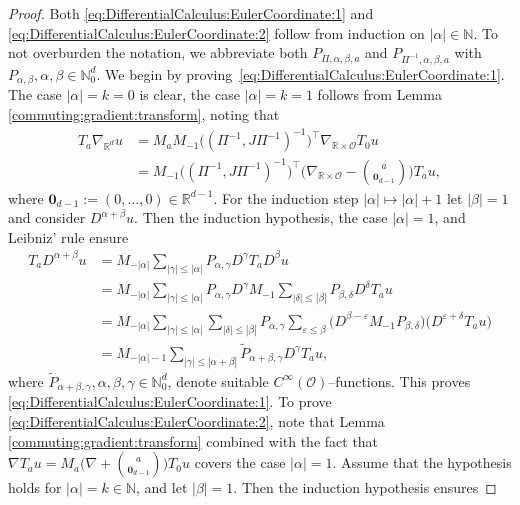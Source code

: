 \documentclass[12pt,a4paper, reqno]{amsart}
\theoremstyle{plain}
\theoremstyle{definition}
\theoremstyle{remark}
\numberwithin{equation}{section}
\newcommand{\1}{\mathbbm{1}}
\newcommand{\R}{\ensuremath{\mathbb{R}}}
\newcommand{\N}{\ensuremath{\mathbb{N}}}
\newcommand{\calO}{\ensuremath{\mathcal{O}}}
\begin{document}
\begin{proof}
    Both \eqref{eq:DifferentialCalculus:EulerCoordinate:1} and \eqref{eq:DifferentialCalculus:EulerCoordinate:2} follow from induction on $|\alpha|\in\N$. To not overburden the notation, we abbreviate both  $P_{\Pi,\alpha,\beta,a}$ and $P_{\Pi^{-1},\alpha,\beta,a}$ with  $P_{\alpha,\beta}, \alpha,\beta\in\N_0^d$.
    We begin by proving~\eqref{eq:DifferentialCalculus:EulerCoordinate:1}. 
    The case $|\alpha|=k=0$ is clear, the case $|\alpha|=k=1$ follows from Lemma \ref{commuting:gradient:transform},
    noting that 
    \[\begin{aligned}
        T_a\nabla_{\R^d} u &= M_a M_{-1}\Big( (\Pi^{-1}, J\Pi^{-1})^{-1}\Big)^\top \nabla_{\R\times\calO}T_0u\\ 
        &= M_{-1} \Big( (\Pi^{-1}, J\Pi^{-1})^{-1}\Big)^\top \bigg(\nabla_{\R\times\calO} -\binom{a}{\bm{0}_{d-1}}\bigg) T_au,
    \end{aligned}\]
    where $\bm{0}_{d-1}:=(0,\ldots,0)\in \R^{d-1}.$
    For the induction step $|\alpha|\mapsto |\alpha|+1$  let $|\beta|=1$ and consider $D^{\alpha+\beta}u$. Then the induction hypothesis, the case $|\alpha|=1$, and Leibniz' rule  ensure 
    \[\begin{aligned}
        T_aD^{\alpha+\beta} u &= M_{-|\alpha|}\sum_{|\gamma|\le |\alpha|} P_{\alpha,\gamma} D^\gamma T_a D^\beta u\\
        &=M_{-|\alpha|}\sum_{|\gamma|\le |\alpha|}P_{\alpha,\gamma} D^\gamma M_{-1} \sum_{|\delta|\le |\beta|} P_{\beta,\delta} D^\delta T_a u\\
        &=M_{-|\alpha|}\sum_{|\gamma|\le |\alpha|} \sum_{|\delta|\le |\beta|} P_{\alpha,\gamma}\sum_{\varepsilon\le \beta}\Big(D^{\beta-\varepsilon}M_{-1}P_{\beta,\delta}\Big)\Big(D^{\varepsilon+\delta} T_a u\Big)\\
        &= M_{-|\alpha|-1} \sum_{|\gamma|\le |\alpha+\beta|} \widetilde{P}_{\alpha+\beta,\gamma} D^\gamma T_a u,
    \end{aligned}\]
    where $\widetilde P_{\alpha+\beta,\gamma}, \alpha,\beta,\gamma\in \N^d_0$, denote suitable $C^\infty(\calO)$–functions.
    This proves \eqref{eq:DifferentialCalculus:EulerCoordinate:1}. 
    To prove \eqref{eq:DifferentialCalculus:EulerCoordinate:2}, note that Lemma \ref{commuting:gradient:transform} combined with the fact that  $\nabla T_a u = M_a\big(\nabla +\binom{a}{\bm{0}_{d-1}}\big)T_0u$ covers the case $|\alpha|=1$. Assume that the hypothesis holds for $|\alpha|=k\in\N$, and let $|\beta|=1$. Then the induction hypothesis ensures 

\end{proof}
\end{document}
